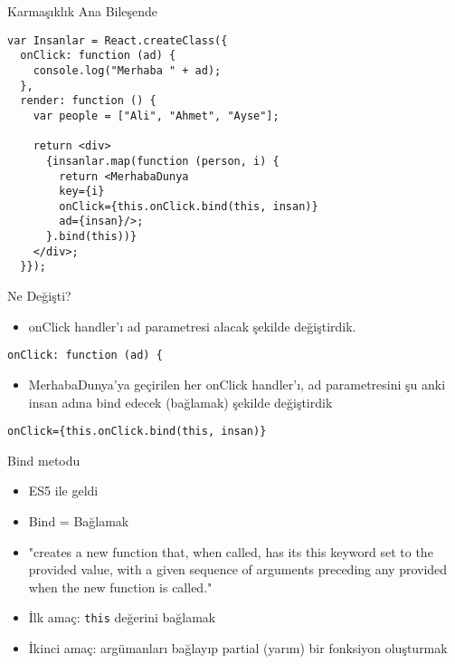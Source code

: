 \documentclass[presentation]{beamer}
\begin{document}
\begin{frame}[fragile,label=sec-11]{Karmaşıklık Ana Bileşende}
 \begin{verbatim}
var Insanlar = React.createClass({
  onClick: function (ad) {
    console.log("Merhaba " + ad);
  },
  render: function () {
    var people = ["Ali", "Ahmet", "Ayse"];

    return <div>
      {insanlar.map(function (person, i) {
        return <MerhabaDunya
        key={i}
        onClick={this.onClick.bind(this, insan)}
        ad={insan}/>;
      }.bind(this))}
    </div>;
  }});
\end{verbatim}
\end{frame}

\begin{frame}[fragile,label=sec-12]{Ne Değişti?}
 \begin{itemize}
\item onClick handler'ı ad parametresi alacak şekilde değiştirdik.
\end{itemize}
\begin{verbatim}
onClick: function (ad) {
\end{verbatim}

\begin{itemize}
\item MerhabaDunya'ya geçirilen her onClick handler'ı, ad parametresini şu anki
insan adına bind edecek (bağlamak) şekilde değiştirdik
\end{itemize}
\begin{verbatim}
onClick={this.onClick.bind(this, insan)}
\end{verbatim}
\end{frame}

\begin{frame}[fragile,label=sec-13]{Bind metodu}
 \begin{itemize}
\item ES5 ile geldi
\item Bind = Bağlamak
\item "creates a new function that, when called, has its this keyword set to the
provided value, with a given sequence of arguments preceding any provided
when the new function is called."
\item İlk amaç: \texttt{this} değerini bağlamak
\item İkinci amaç: argümanları bağlayıp \alert{partial} (yarım) bir fonksiyon oluşturmak
\end{itemize}
\end{frame}
\end{document}
